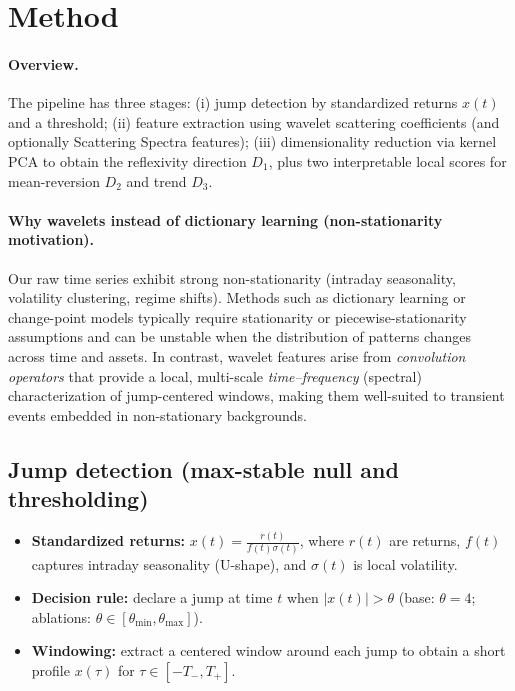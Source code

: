 \documentclass[11pt]{article}
\begin{document}
\section{Method}

\paragraph{Overview.}
The pipeline has three stages: (i) jump detection by standardized returns $x(t)$ and a threshold; (ii) feature extraction using wavelet scattering coefficients (and optionally Scattering Spectra features); (iii) dimensionality reduction via kernel PCA to obtain the reflexivity direction $D_1$, plus two interpretable local scores for mean-reversion $D_2$ and trend $D_3$.

\paragraph{Why wavelets instead of dictionary learning (non-stationarity motivation).}
Our raw time series exhibit strong non-stationarity (intraday seasonality, volatility clustering, regime shifts). Methods such as dictionary learning or change-point models typically require stationarity or piecewise-stationarity assumptions and can be unstable when the distribution of patterns changes across time and assets. In contrast, wavelet features arise from \emph{convolution operators} that provide a local, multi-scale \emph{time--frequency} (spectral) characterization of jump-centered windows, making them well-suited to transient events embedded in non-stationary backgrounds.

\subsection*{Jump detection (max-stable null and thresholding)}
\begin{itemize}
    \item \textbf{Standardized returns:} $x(t)=\frac{r(t)}{f(t)\sigma(t)}$, where $r(t)$ are returns, $f(t)$ captures intraday seasonality (U-shape), and $\sigma(t)$ is local volatility. 
    \item \textbf{Decision rule:} declare a jump at time $t$ when $|x(t)|>\theta$ (base: $\theta=4$; ablations: $\theta\in[\theta_{\min},\theta_{\max}]$). 
    \item \textbf{Windowing:} extract a centered window around each jump to obtain a short profile $x(\tau)$ for $\tau\in[-T_-,T_+]$.
\end{itemize}
\end{document}
